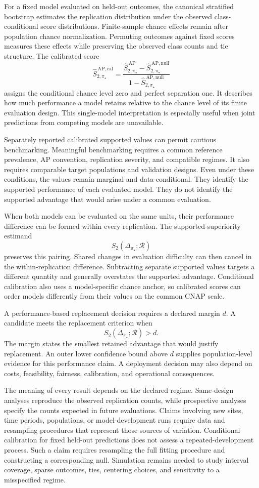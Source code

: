 \documentclass[11pt]{article}
\newcommand{\Regime}{\mathcal{R}}
\newcommand{\SAPHat}{\widehat S_{2,\pi_\star}^{\,\mathrm{AP}}}
\newcommand{\SAPnullHat}{\widehat S_{2,\pi_\star}^{\,\mathrm{AP,null}}}
\newcommand{\SAPcalHat}{\widehat S_{2,\pi_\star}^{\,\mathrm{AP,cal}}}
\theoremstyle{remark}
\begin{document}
For a fixed model evaluated on held-out outcomes, the canonical stratified bootstrap estimates the replication distribution under the observed class-conditional score distributions. Finite-sample chance effects remain after population chance normalization. Permuting outcomes against fixed scores measures these effects while preserving the observed class counts and tie structure. The calibrated score
\[
\SAPcalHat
=
\frac{\SAPHat-\SAPnullHat}{1-\SAPnullHat}
\]
assigns the conditional chance level zero and perfect separation one. It describes how much performance a model retains relative to the chance level of its finite evaluation design. This single-model interpretation is especially useful when joint predictions from competing models are unavailable.

Separately reported calibrated supported values can permit cautious benchmarking. Meaningful benchmarking requires a common reference prevalence, AP convention, replication severity, and compatible regimes. It also requires comparable target populations and validation designs. Even under these conditions, the values remain marginal and data-conditional. They identify the supported performance of each evaluated model. They do not identify the supported advantage that would arise under a common evaluation.

When both models can be evaluated on the same units, their performance difference can be formed within every replication. The supported-superiority estimand
\[
S_2(\Delta_{\pi_\star};\Regime)
\]
preserves this pairing. Shared changes in evaluation difficulty can then cancel in the within-replication difference. Subtracting separate supported values targets a different quantity and generally overstates the supported advantage. Conditional calibration also uses a model-specific chance anchor, so calibrated scores can order models differently from their values on the common CNAP scale.

A performance-based replacement decision requires a declared margin $d$. A candidate meets the replacement criterion when
\[
S_2(\Delta_{\pi_\star};\Regime)>d.
\]
The margin states the smallest retained advantage that would justify replacement. An outer lower confidence bound above $d$ supplies population-level evidence for this performance claim. A deployment decision may also depend on costs, feasibility, fairness, calibration, and operational consequences.

The meaning of every result depends on the declared regime. Same-design analyses reproduce the observed replication counts, while prospective analyses specify the counts expected in future evaluations. Claims involving new sites, time periods, populations, or model-development runs require data and resampling procedures that represent those sources of variation. Conditional calibration for fixed held-out predictions does not assess a repeated-development process. Such a claim requires resampling the full fitting procedure and constructing a corresponding null. Simulation remains needed to study interval coverage, sparse outcomes, ties, centering choices, and sensitivity to a misspecified regime.
\end{document}
